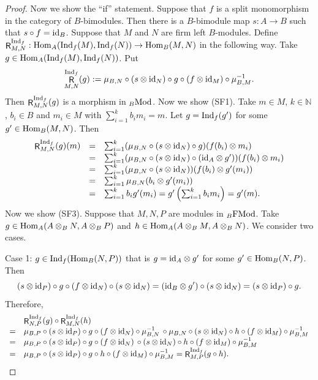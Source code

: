 \documentclass[12pt]{amsart}
\theoremstyle{definition}
\newcommand{\N}{\mathbb{N}}
\newcommand{\Mod}{{\rm Mod}}
\newcommand{\FMod}{{\rm FMod}}
\newcommand{\id}{{\rm id}}
\newcommand{\Hom}{{\rm Hom}}
\newcommand{\Ind}{{\rm Ind}}
\DeclareMathOperator{\R}{\mathsf R}
\begin{document}
\begin{proof}
Now we show the ``if'' statement.
Suppose that $f$ is a split monomorphism in the 
category of $B$-bimodules. Then there is a 
$B$-bimodule map
$s : A \to B$ such that $s \circ f = \id_B$.
Suppose that $M$ and $N$ are firm left $B$-modules.
Define 
$\R_{M,N}^{\Ind_f} : 
\Hom_A(\Ind_f(M),\Ind_f(N)) \to 
\Hom_B(M,N)$
in the following way. 
Take 
$g \in \Hom_A(\Ind_f(M) , \Ind_f(N))$.
Put
\[
\R_{M,N}^{\Ind_f}(g) :=
\mu_{B,N} \circ (s \otimes \id_N) 
\circ g \circ 
(f \otimes \id_M) \circ \mu_{B,M}^{-1}.
\]
Then $\R_{M,N}^{\Ind_f}(g)$
is a morphism in ${}_B \Mod$.
Now we show (SF1).
Take $m \in M$,
$k \in \N$, $b_i \in B$ and $m_i \in M$
with $\sum_{i=1}^k b_i m_i = m$. 
Let $g = \Ind_f(g')$ for some 
$g' \in \Hom_B(M,N)$. Then 
\[
\begin{array}{rcl}
\R_{M,N}^{\Ind_f}(g)(m) 
&=& 
\sum_{i=1}^k (\mu_{B,N} \circ
(s \otimes \id_N) \circ g)
(f(b_i) \otimes m_i) \\
&=&
\sum_{i=1}^k
(\mu_{B,N} \circ (s \otimes \id_N)
\circ (\id_A \otimes g')) 
(f(b_i) \otimes m_i) \\ 
&=& 
\sum_{i=1}^k
(\mu_{B,N} \circ (s \otimes \id_N))
(f(b_i) \otimes g'(m_i)) \\ 
&=& 
\sum_{i=1}^k
\mu_{B,N} (b_i \otimes g'(m_i)) \\
&=& \sum_{i=1}^k b_i g'(m_i) 
= g' \left( \sum_{i=1}^k b_i m_i \right)
= g'(m).
\end{array}
\]
Now we show (SF3).
Suppose that $M,N,P$ are modules in ${}_B \FMod$. 
Take $g \in \Hom_A(A \otimes_B N,
A \otimes_B P)$ and 
$h \in \Hom_A(A \otimes_B M,
A \otimes_B N)$. 
We consider two cases.

Case 1: $g \in \Ind_f(\Hom_B(N,P))$
that is 
$g = \id_A \otimes g'$ for 
some $g' \in \Hom_B(N,P)$. Then
\[
(s \otimes \id_P) \circ g \circ 
(f \otimes \id_N) \circ 
(s \otimes \id_N) = 
(\id_B \otimes g') \circ 
(s \otimes \id_N) = 
(s \otimes \id_P) \circ g.
\]
Therefore,
{\small \[
\begin{array}{cl}
 & \R_{N,P}^{\Ind_f}(g) \circ
\R_{M,N}^{\Ind_f}(h) \\ 
= & \mu_{B,P} \circ (s \otimes \id_P)
\circ g \circ (f \otimes \id_N)
\circ \mu_{B,N}^{-1} \, \circ 
 \mu_{B,N} \circ (s \otimes \id_N)
\circ h \circ (f \otimes \id_M) 
\circ \mu_{B,M}^{-1} \\
=& \mu_{B,P} \circ (s \otimes \id_P)
\circ g \circ (f \otimes \id_N) \, \circ   
(s \otimes \id_N) \circ h \circ 
(f \otimes \id_M) \circ \mu_{B,M}^{-1} \\
=& \mu_{B,P} \circ (s \otimes \id_P) 
\circ g \circ h \circ 
(f \otimes \id_M) \circ \mu_{B,M}^{-1} 
= \R_{M,P}^{\Ind_f}(g \circ h).
\end{array}
\]}


\end{proof}
\end{document}
